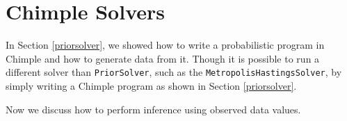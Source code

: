 \label{solvers}
\chapter{Chimple Solvers}

In Section \ref{priorsolver}, we showed how to write a probabilistic program in
Chimple and how to generate data from it.
Though it is possible to run a different solver than \texttt{PriorSolver}, such
as the \texttt{MetropolisHastingsSolver}, by simply writing a Chimple program
as shown in Section \ref{priorsolver}.

Now we discuss how to perform inference using observed data values.
